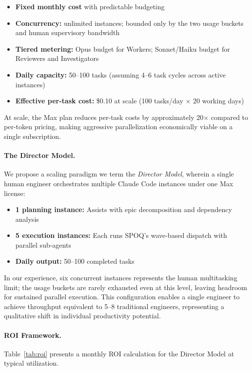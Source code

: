 \begin{itemize}
    \item \textbf{Fixed monthly cost} with predictable budgeting
    \item \textbf{Concurrency:} unlimited instances; bounded only by the
    two usage buckets and human supervisory bandwidth
    \item \textbf{Tiered metering:} Opus budget for Workers; Sonnet/Haiku
    budget for Reviewers and Investigators
    \item \textbf{Daily capacity:} 50--100 tasks (assuming 4--6 task cycles
    across active instances)
    \item \textbf{Effective per-task cost:} \$0.10 at scale (100 tasks/day
    $\times$ 20 working days)
\end{itemize}

At scale, the Max plan reduces per-task costs by approximately 20$\times$
compared to per-token pricing, making aggressive parallelization economically
viable on a single subscription.

\clearpage
\paragraph{The Director Model.}
We propose a scaling paradigm we term the \emph{Director Model}, wherein a
single human engineer orchestrates multiple Claude Code instances under one
Max license:

\begin{itemize}
    \item \textbf{1 planning instance:} Assists with epic decomposition and
    dependency analysis
    \item \textbf{5 execution instances:} Each runs SPOQ's wave-based dispatch
    with parallel sub-agents
    \item \textbf{Daily output:} 50--100 completed tasks
\end{itemize}

In our experience, six concurrent instances represents the human
multitasking limit; the usage buckets are rarely exhausted even at this
level, leaving headroom for sustained parallel execution. This configuration
enables a single engineer
to achieve throughput equivalent to 5--8 traditional engineers, representing
a qualitative shift in individual productivity potential.

\paragraph{ROI Framework.}
Table~\ref{tab:roi} presents a monthly ROI calculation for the Director Model
at typical utilization.


